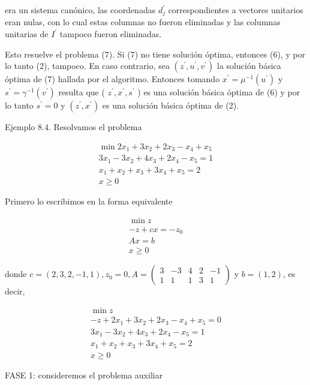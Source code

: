 \documentclass[10pt]{article}
\begin{document}
era un sistema canónico, las coordenadas $d_{j}^{\prime}$ correspondientes a vectores unitarios eran nulas, con lo cual estas columnas no fueron eliminadas y las columnas unitarias de $I^{\prime}$ tampoco fueron eliminadas.

Esto resuelve el problema (7). Si (7) no tiene solución óptima, entonces (6), y por lo tanto (2), tampoco. En caso contrario, sea $\left(z^{\prime}, u^{\prime}, v^{\prime}\right)$ la solución básica óptima de (7) hallada por el algoritmo. Entonces tomando $x^{\prime}=\mu^{-1}\left(u^{\prime}\right)$ y $s^{\prime}=\gamma^{-1}\left(v^{\prime}\right)$ resulta que ( $z^{\prime}, x^{\prime}, s^{\prime}$ ) es una solución básica óptima de (6) y por lo tanto $s^{\prime}=0$ y $\left(z^{\prime}, x^{\prime}\right)$ es una solución básica óptima de (2).

Ejemplo 8.4. Resolvamos el problema

$$
\begin{gathered}
\min 2 x_{1}+3 x_{2}+2 x_{3}-x_{4}+x_{5} \\
3 x_{1}-3 x_{2}+4 x_{3}+2 x_{4}-x_{5}=1 \\
x_{1}+x_{2}+x_{3}+3 x_{4}+x_{5}=2 \\
x \geq 0
\end{gathered}
$$

Primero lo escribimos en la forma equivalente

$$
\begin{gathered}
\min z \\
-z+c x=-z_{0} \\
A x=b \\
x \geq 0
\end{gathered}
$$

donde $c=(2,3,2,-1,1), z_{0}=0, A=\left(\begin{array}{ccccc}3 & -3 & 4 & 2 & -1 \\ 1 & 1 & 1 & 3 & 1\end{array}\right)$ y $b=(1,2)$, es decir,

$$
\begin{gathered}
\min z \\
-z+2 x_{1}+3 x_{2}+2 x_{3}-x_{4}+x_{5}=0 \\
3 x_{1}-3 x_{2}+4 x_{3}+2 x_{4}-x_{5}=1 \\
x_{1}+x_{2}+x_{3}+3 x_{4}+x_{5}=2 \\
x \geq 0
\end{gathered}
$$

FASE 1: consideremos el problema auxiliar
\end{document}
